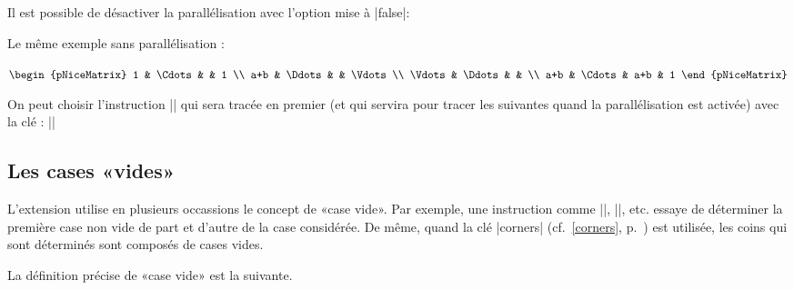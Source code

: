 \documentclass[dvipsnames]{article}
\begin{document}
\bigskip
Il est possible de désactiver la parallélisation avec l'option
 mise à |false|: 

\nobreak
\medskip
\begin{scope}
%
\begin{minipage}{9.5cm}
Le même exemple sans parallélisation :
\end{minipage}
$\begin{pNiceMatrix}
  1      & \Cdots  &     & 1      \\
  a+b    & \Ddots  &     & \Vdots \\
  \Vdots & \Ddots  &     &        \\
  a+b    & \Cdots  & a+b & 1
\end{pNiceMatrix}$

\end{scope}

\medskip
{}
On peut choisir l'instruction |\Ddots| qui sera tracée en premier (et qui
servira pour tracer les suivantes quand la parallélisation est activée) avec la
clé  : ||



\subsection{Les cases «vides»}

\label{empty-cells}

L'extension  utilise en plusieurs occassions le concept de «case
vide». Par exemple, une instruction comme |\Ldots|, |\Cdots|, etc. essaye de
déterminer la première case non vide de part et d'autre de la case considérée.
De même, quand la clé |corners| (cf.~\ref{corners}, p.~\pageref{corners}) est
utilisée, les coins qui sont déterminés sont composés de cases vides.

La définition précise de «case vide» est la suivante.
\end{document}
